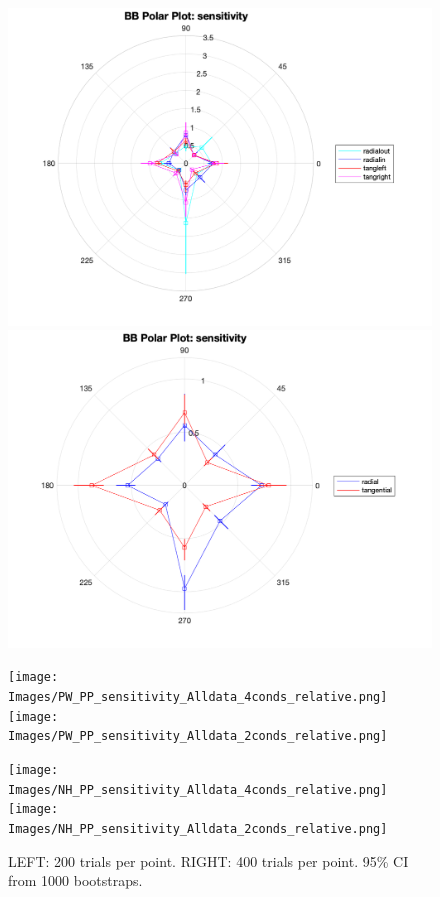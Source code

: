 \documentclass[11pt]{article} %
\begin{document}
\begin{figure}[H]
\centering %
\includegraphics[scale=.3]{Images/BB_PP_sensitivity_Alldata_4conds.png}
\includegraphics[scale=.3]{Images/BB_PP_sensitivity_Alldata_2conds.png}
\end{figure}
\begin{figure}[H]
\centering %
\texttt{[image: Images/PW\_PP\_sensitivity\_Alldata\_4conds\_relative.png]}
\texttt{[image: Images/PW\_PP\_sensitivity\_Alldata\_2conds\_relative.png]}
\end{figure}
\begin{figure}[H]
\centering %
\texttt{[image: Images/NH\_PP\_sensitivity\_Alldata\_4conds\_relative.png]}
\texttt{[image: Images/NH\_PP\_sensitivity\_Alldata\_2conds\_relative.png]}
\caption{LEFT: 200 trials per point. RIGHT: 400 trials per point. 95\% CI from 1000 bootstraps.}
\end{figure}
\end{document}
